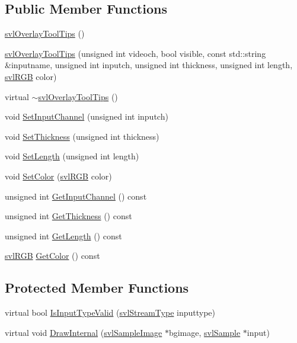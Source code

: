 \subsection*{Public Member Functions}
\begin{DoxyCompactItemize}
\item 
\hyperlink{classsvl_overlay_tool_tips_a2cfbb138094f1db521ec7cd86c060f01}{svl\+Overlay\+Tool\+Tips} ()
\item 
\hyperlink{classsvl_overlay_tool_tips_aa848d987b68e3a1a7668f230fd284199}{svl\+Overlay\+Tool\+Tips} (unsigned int videoch, bool visible, const std\+::string \&inputname, unsigned int inputch, unsigned int thickness, unsigned int length, \hyperlink{structsvl_r_g_b}{svl\+R\+G\+B} color)
\item 
virtual \hyperlink{classsvl_overlay_tool_tips_a40e49c02d9a88987fb00c8ef09415a5e}{$\sim$svl\+Overlay\+Tool\+Tips} ()
\item 
void \hyperlink{classsvl_overlay_tool_tips_affa289f95318ddbceec68bfe864ade35}{Set\+Input\+Channel} (unsigned int inputch)
\item 
void \hyperlink{classsvl_overlay_tool_tips_aa077d707668802f6b3a021fd6ecf0168}{Set\+Thickness} (unsigned int thickness)
\item 
void \hyperlink{classsvl_overlay_tool_tips_a27973121afdc64a83d22ecd9151734df}{Set\+Length} (unsigned int length)
\item 
void \hyperlink{classsvl_overlay_tool_tips_af643e9f71255e85e407558ea535cc63a}{Set\+Color} (\hyperlink{structsvl_r_g_b}{svl\+R\+G\+B} color)
\item 
unsigned int \hyperlink{classsvl_overlay_tool_tips_ad0d1a6ed63ea5c58666f13dfe25671a9}{Get\+Input\+Channel} () const 
\item 
unsigned int \hyperlink{classsvl_overlay_tool_tips_aecab6109a96d0e2f57f733a0ea8ee707}{Get\+Thickness} () const 
\item 
unsigned int \hyperlink{classsvl_overlay_tool_tips_addad557317dfbd5174ca7b0a9c3fd1f9}{Get\+Length} () const 
\item 
\hyperlink{structsvl_r_g_b}{svl\+R\+G\+B} \hyperlink{classsvl_overlay_tool_tips_a07830858648255c59a803944a55a12f8}{Get\+Color} () const 
\end{DoxyCompactItemize}
\subsection*{Protected Member Functions}
\begin{DoxyCompactItemize}
\item 
virtual bool \hyperlink{classsvl_overlay_tool_tips_a644fbbf28f0021f2a3e28530d5772f59}{Is\+Input\+Type\+Valid} (\hyperlink{svl_definitions_8h_aa00696d338a58db361335a01fd11e122}{svl\+Stream\+Type} inputtype)
\item 
virtual void \hyperlink{classsvl_overlay_tool_tips_a0f0e0ac0860ceb1ce0b57f63d3789d44}{Draw\+Internal} (\hyperlink{classsvl_sample_image}{svl\+Sample\+Image} $\ast$bgimage, \hyperlink{classsvl_sample}{svl\+Sample} $\ast$input)
\end{DoxyCompactItemize}
